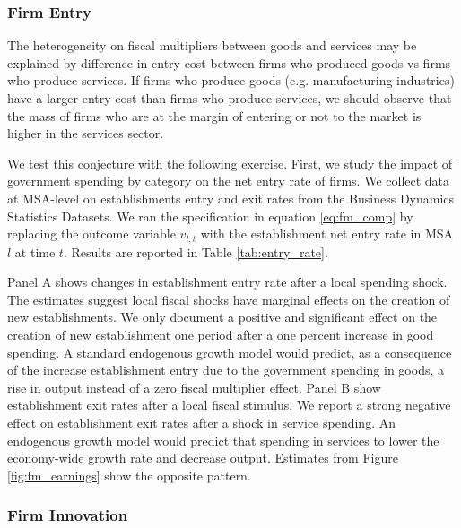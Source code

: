 \documentclass[dv_diss_main.tex]{subfiles}
\begin{document}
\subsubsection{Firm Entry}
The heterogeneity on fiscal multipliers between goods and services may be explained by difference in entry cost between firms who produced goods vs firms who produce services. If firms who produce goods (e.g. manufacturing industries) have a larger entry cost than firms who produce services, we should observe that the mass of firms who are at the margin of entering or not to the market is higher in the services sector. 

We test this conjecture with the following exercise. First, we study the impact of government spending by category on the net entry rate of firms. We collect data at MSA-level on establishments entry and exit rates from the Business Dynamics Statistics Datasets. We ran the specification in equation \eqref{eq:fm_comp} by replacing the outcome variable $v_{l,t}$ with the establishment net entry rate in MSA $l$ at time $t$. Results are reported in Table \ref{tab:entry_rate}. 

Panel A shows changes in establishment entry rate after a local spending shock. The estimates suggest local fiscal shocks have marginal effects on the creation of new establishments. We only document a positive and significant effect on the creation of new establishment one period after a one percent increase in good spending. A standard endogenous growth model would predict, as a consequence of the increase establishment entry due to the government spending in goods, a rise in output instead of a zero fiscal multiplier effect. Panel B show establishment exit rates after a local fiscal stimulus. We report a strong negative effect on establishment exit rates after a shock in service spending. An endogenous growth model would predict that spending in services to lower the economy-wide growth rate and decrease output. Estimates from Figure \ref{fig:fm_earnings} show the opposite pattern. 

\subsubsection{Firm Innovation}
\end{document}
